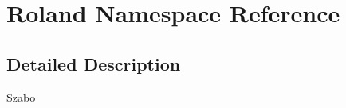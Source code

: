 \section{Roland Namespace Reference}
\label{namespace_roland}


\subsection{Detailed Description}
Szabo 